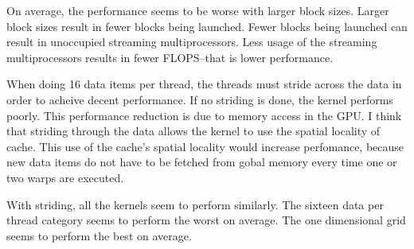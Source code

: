 \documentclass[a4paper,12pt]{article}
\begin{document}
On average, the performance seems to be worse with larger block sizes.
Larger block sizes result in fewer blocks being launched.
Fewer blocks being launched can result in unoccupied streaming multiprocessors.
Less usage of the streaming multiprocessors results in fewer FLOPS--that is lower performance.

When doing 16 data items per thread, the threads must stride across the data in order to acheive decent performance.
If no striding is done, the kernel performs poorly.
This performance reduction is due to memory access in the GPU.
I think that striding through the data allows the kernel to use the spatial locality of cache.
This use of the cache's spatial locality would increase perfomance, because new data items do not have to be fetched from gobal memory every time one or two warps are executed.

With striding, all the kernels seem to perform similarly.
The sixteen data per thread category seems to perform the worst on average.
The one dimensional grid seems to perform the best on average.
\end{document}

